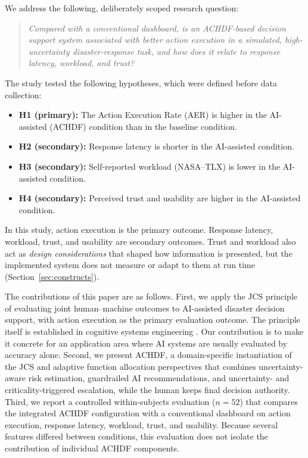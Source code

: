 \documentclass[journal]{IEEEtran}
\theoremstyle{plain}
\theoremstyle{definition}
\begin{document}
We address the following, deliberately scoped research question:
\begin{quote}
    \emph{Compared with a conventional dashboard, is an ACHDF-based decision support system associated with better action execution in a simulated, high-uncertainty disaster-response task, and how does it relate to response latency, workload, and trust?}
\end{quote}
The study tested the following hypotheses, which were defined before data collection:
\begin{itemize}
    \item \textbf{H1 (primary):} The Action Execution Rate (AER) is higher in the AI-assisted (ACHDF) condition than in the baseline condition.
    \item \textbf{H2 (secondary):} Response latency is shorter in the AI-assisted condition.
    \item \textbf{H3 (secondary):} Self-reported workload (NASA--TLX) is lower in the AI-assisted condition.
    \item \textbf{H4 (secondary):} Perceived trust and usability are higher in the AI-assisted condition.
\end{itemize}
In this study, action execution is the primary outcome. Response latency, workload, trust, and usability are secondary outcomes. Trust and workload also act as \emph{design considerations} that shaped how information is presented, but the implemented system does not measure or adapt to them at run time (Section~\ref{sec:constructs}).

The contributions of this paper are as follows. First, we apply the JCS principle of evaluating joint human--machine outcomes to AI-assisted disaster decision support, with action execution as the primary evaluation outcome. The principle itself is established in cognitive systems engineering \cite{Hollnagel2005JCS,Woods2006JCS}. Our contribution is to make it concrete for an application area where AI systems are usually evaluated by accuracy alone. Second, we present ACHDF, a domain-specific instantiation of the JCS and adaptive function allocation perspectives that combines uncertainty-aware risk estimation, guardrailed AI recommendations, and uncertainty- and criticality-triggered escalation, while the human keeps final decision authority. Third, we report a controlled within-subjects evaluation ($n=52$) that compares the integrated ACHDF configuration with a conventional dashboard on action execution, response latency, workload, trust, and usability. Because several features differed between conditions, this evaluation does not isolate the contribution of individual ACHDF components.
\end{document}
